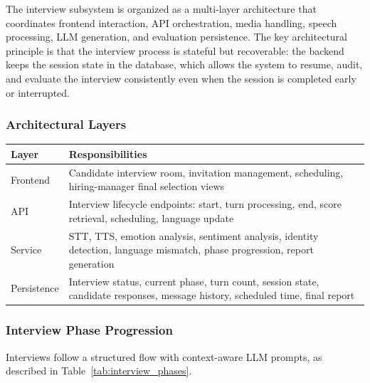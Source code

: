 The interview subsystem is organized as a multi-layer architecture that coordinates frontend interaction, API orchestration, media handling, speech processing, LLM generation, and evaluation persistence. The key architectural principle is that the interview process is stateful but recoverable: the backend keeps the session state in the database, which allows the system to resume, audit, and evaluate the interview consistently even when the session is completed early or interrupted.

\subsubsection{Architectural Layers}

\begin{center}
\label{tab:interview_layers}
\renewcommand{\arraystretch}{0.8}

\begin{tabularx}{\textwidth}{|p{3cm}|X|}
\hline
\rowcolor{gray!20} \textbf{Layer} & \textbf{Responsibilities} \\
\hline
Frontend & Candidate interview room, invitation management, scheduling, hiring-manager final selection views \\
\hline
API & Interview lifecycle endpoints: start, turn processing, end, score retrieval, scheduling, language update \\
\hline
Service & STT, TTS, emotion analysis, sentiment analysis, identity detection, language mismatch, phase progression, report generation \\
\hline
Persistence & Interview status, current phase, turn count, session state, candidate responses, message history, scheduled time, final report \\
\hline
\end{tabularx}
\end{center}

\subsubsection{Interview Phase Progression}

Interviews follow a structured flow with context-aware LLM prompts, as described in Table~\ref{tab:interview_phases}.

